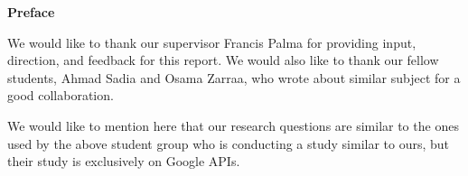 \noindent \textbf{\large{Preface}}

 We would like to thank our supervisor Francis Palma for providing input, direction, and feedback for this report. We would also like to thank our fellow students, Ahmad Sadia and Osama Zarraa, who wrote about similar subject for a good collaboration. 
 
 We would like to mention here that our research questions are similar to the ones used by the above student group who is conducting a study similar to ours, but their study is exclusively on Google APIs.
